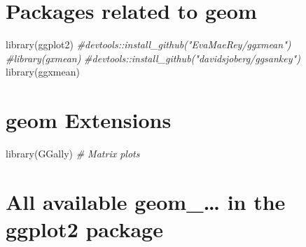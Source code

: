 \documentclass[
]{book}
\newenvironment{Shaded}{\begin{snugshade}}{\end{snugshade}}
\newcommand{\CommentTok}[1]{\textcolor[rgb]{0.56,0.35,0.01}{\textit{#1}}}
\newcommand{\FunctionTok}[1]{\textcolor[rgb]{0.00,0.00,0.00}{#1}}
\newcommand{\NormalTok}[1]{#1}
\begin{document}
\hypertarget{packages-related-to-geom}{%
\section{Packages related to geom}\label{packages-related-to-geom}}

\begin{Shaded}
\begin{Highlighting}[]
\FunctionTok{library}\NormalTok{(ggplot2)}
\CommentTok{\#devtools::install\_github("EvaMaeRey/ggxmean")}
\CommentTok{\#library(gxmean)}
\CommentTok{\#devtools::install\_github("davidsjoberg/ggsankey")}
\FunctionTok{library}\NormalTok{(ggxmean)}
\end{Highlighting}
\end{Shaded}

\hypertarget{geom-extensions}{%
\section{geom Extensions}\label{geom-extensions}}

\begin{Shaded}
\begin{Highlighting}[]
\FunctionTok{library}\NormalTok{(GGally) }\CommentTok{\# Matrix plots}
\end{Highlighting}
\end{Shaded}

\hypertarget{all-available-geom_-in-the-ggplot2-package}{%
\section{All available geom\_\ldots{} in the ggplot2 package}\label{all-available-geom_-in-the-ggplot2-package}}
\end{document}
